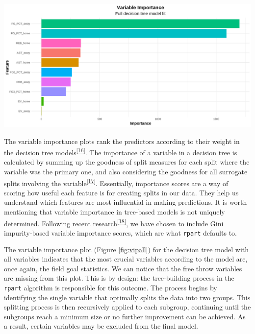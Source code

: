 \documentclass[
  12pt,
  a4paper,
]{article}
\let\origfigure\figure
\let\endorigfigure\endfigure
\renewenvironment{figure}[1][2] {
    \expandafter\origfigure\expandafter[H]
} {
    \endorigfigure
}
\begin{document}
\begin{figure}

{\centering \includegraphics[width=1\linewidth]{latex/plotspng/plot_8} 

}

\caption{Variable Importance plot for model with all variables included}\label{fig:vipall}
\end{figure}

The variable importance plots rank the predictors according to their weight in the decision tree models\textsuperscript{{[}\protect\hyperlink{ref-bruce2020practical}{16}{]}}. The importance of a variable in a decision tree is calculated by summing up the goodness of split measures for each split where the variable was the primary one, and also considering the goodness for all surrogate splits involving the variable\textsuperscript{{[}\protect\hyperlink{ref-rpart-vignette}{17}{]}}. Essentially, importance scores are a way of scoring how useful each feature is for creating splits in our data. They help us understand which features are most influential in making predictions. It is worth mentioning that variable importance in tree-based models is not uniquely determined. Following recent research\textsuperscript{{[}\protect\hyperlink{ref-permvip}{18}{]}}, we have chosen to include Gini impurity-based variable importance scores, which are what \texttt{rpart} defaults to.

The variable importance plot (Figure \ref{fig:vipall}) for the decision tree model with all variables indicates that the most crucial variables according to the model are, once again, the field goal statistics. We can notice that the free throw variables are missing from this plot. This is by design: the tree-building process in the \texttt{rpart} algorithm is responsible for this outcome. The process begins by identifying the single variable that optimally splits the data into two groups. This splitting process is then recursively applied to each subgroup, continuing until the subgroups reach a minimum size or no further improvement can be achieved. As a result, certain variables may be excluded from the final model.
\end{document}
